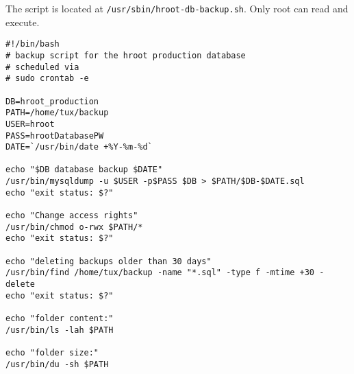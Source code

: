 \documentclass{article}
\begin{document}
The script is located at \verb|/usr/sbin/hroot-db-backup.sh|. Only root can read and execute.
\begin{lstlisting}
#!/bin/bash
# backup script for the hroot production database
# scheduled via
# sudo crontab -e

DB=hroot_production
PATH=/home/tux/backup
USER=hroot
PASS=hrootDatabasePW
DATE=`/usr/bin/date +%Y-%m-%d`

echo "$DB database backup $DATE" 
/usr/bin/mysqldump -u $USER -p$PASS $DB > $PATH/$DB-$DATE.sql
echo "exit status: $?" 

echo "Change access rights"
/usr/bin/chmod o-rwx $PATH/*
echo "exit status: $?"

echo "deleting backups older than 30 days"
/usr/bin/find /home/tux/backup -name "*.sql" -type f -mtime +30 -delete
echo "exit status: $?" 

echo "folder content:"
/usr/bin/ls -lah $PATH

echo "folder size:"
/usr/bin/du -sh $PATH
\end{lstlisting}
\end{document}
